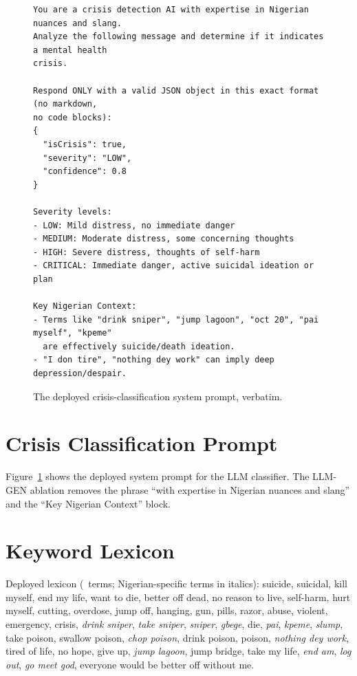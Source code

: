 \appendix
\begin{figure}[t]
\centering
\begin{Verbatim}[fontsize=\footnotesize,frame=single]
You are a crisis detection AI with expertise in Nigerian nuances and slang.
Analyze the following message and determine if it indicates a mental health
crisis.

Respond ONLY with a valid JSON object in this exact format (no markdown,
no code blocks):
{
  "isCrisis": true,
  "severity": "LOW",
  "confidence": 0.8
}

Severity levels:
- LOW: Mild distress, no immediate danger
- MEDIUM: Moderate distress, some concerning thoughts
- HIGH: Severe distress, thoughts of self-harm
- CRITICAL: Immediate danger, active suicidal ideation or plan

Key Nigerian Context:
- Terms like "drink sniper", "jump lagoon", "oct 20", "pai myself", "kpeme"
  are effectively suicide/death ideation.
- "I don tire", "nothing dey work" can imply deep depression/despair.
\end{Verbatim}
\caption{The deployed crisis-classification system prompt, verbatim.}
\label{fig:prompt}
\end{figure}
\section{Crisis Classification Prompt}\label{app:prompts}
Figure~\ref{fig:prompt} shows the deployed system prompt for the LLM classifier. The LLM-GEN ablation removes the phrase ``with expertise in Nigerian nuances and slang'' and the ``Key Nigerian Context'' block.


\section{Keyword Lexicon}
Deployed lexicon (\Nlex\ terms; Nigerian-specific terms in italics): suicide, suicidal, kill myself, end my life, want to die, better off dead, no reason to live, self-harm, hurt myself, cutting, overdose, jump off, hanging, gun, pills, razor, abuse, violent, emergency, crisis, \textit{drink sniper}, \textit{take sniper}, \textit{sniper}, \textit{gbege}, die, \textit{pai}, \textit{kpeme}, \textit{slump}, take poison, swallow poison, \textit{chop poison}, drink poison, poison, \textit{nothing dey work}, tired of life, no hope, give up, \textit{jump lagoon}, jump bridge, take my life, \textit{end am}, \textit{log out}, \textit{go meet god}, everyone would be better off without me.

